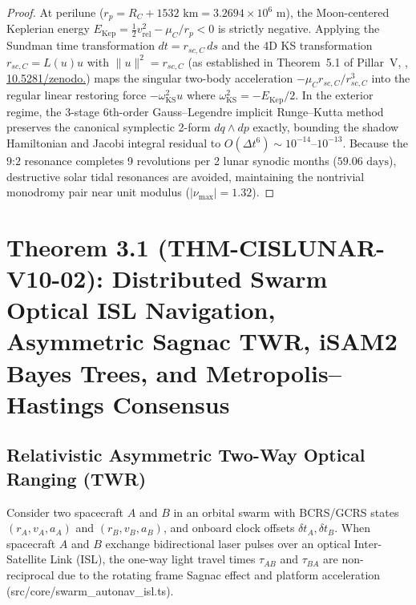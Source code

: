 \documentclass[11pt,a4paper,reqno]{article}
\def\bm#1{#1}%
\def\texttt#1{#1}%
\def\mathcal#1{#1}%
\def\mathbb#1{#1}%
\newcommand{\zenodo}[1]{\href{https://doi.org/10.5281/zenodo.#1}{\texttt{10.5281/\allowbreak zenodo.\allowbreak #1}}}
\theoremstyle{plain}
\theoremstyle{definition}
\theoremstyle{remark}
\numberwithin{equation}{section}
\begin{document}
\begin{proof}
At perilune ($r_p = R_{\mathbb{C}} + 1532\text{ km} = 3.2694 \times 10^6\text{ m}$), the Moon-centered Keplerian energy $E_{\text{Kep}} = \frac{1}{2}v_{\text{rel}}^2 - \mu_{\mathbb{C}} / r_p < 0$ is strictly negative. Applying the Sundman time transformation $dt = r_{sc,\mathbb{C}}\,ds$ and the 4D KS transformation $\bm{r}_{sc,\mathbb{C}} = \bm{L}(\bm{u})\bm{u}$ with $\|\bm{u}\|^2 = r_{sc,\mathbb{C}}$ (as established in Theorem~5.1 of Pillar~V, \cite{UnmaniPillarV2026}, \zenodo{23226184}) maps the singular two-body acceleration $-\mu_{\mathbb{C}}\bm{r}_{sc,\mathbb{C}}/r_{sc,\mathbb{C}}^3$ into the regular linear restoring force $-\omega_{\text{KS}}^2 \bm{u}$ where $\omega_{\text{KS}}^2 = -E_{\text{Kep}}/2$. In the exterior regime, the 3-stage 6th-order Gauss--Legendre implicit Runge--Kutta method preserves the canonical symplectic 2-form $d\bm{q} \wedge d\bm{p}$ exactly, bounding the shadow Hamiltonian and Jacobi integral residual to $\mathcal{O}(\Delta t^6) \sim 10^{-14}$--$10^{-13}$. Because the $9\text{:}2$ resonance completes 9 revolutions per 2 lunar synodic months ($59.06\text{ days}$), destructive solar tidal resonances are avoided, maintaining the nontrivial monodromy pair near unit modulus ($|\nu_{\max}| = 1.32$).
\end{proof}

\section{\texorpdfstring{Theorem 3.1 (\texttt{THM-CISLUNAR-V10-02}): Distributed Swarm Optical ISL Navigation, Asymmetric Sagnac TWR, iSAM2 Bayes Trees, and Metropolis--Hastings Consensus}{Theorem 3.1 (THM-CISLUNAR-V10-02): Distributed Swarm Optical ISL Navigation, Asymmetric Sagnac TWR, iSAM2 Bayes Trees, and Metropolis-Hastings Consensus}}

\subsection{Relativistic Asymmetric Two-Way Optical Ranging (TWR)}
Consider two spacecraft $A$ and $B$ in an orbital swarm with BCRS/GCRS states $(\bm{r}_A, \bm{v}_A, \bm{a}_A)$ and $(\bm{r}_B, \bm{v}_B, \bm{a}_B)$, and onboard clock offsets $\delta t_A, \delta t_B$. When spacecraft $A$ and $B$ exchange bidirectional laser pulses over an optical Inter-Satellite Link (ISL), the one-way light travel times $\tau_{AB}$ and $\tau_{BA}$ are non-reciprocal due to the rotating frame Sagnac effect and platform acceleration (\texttt{src/core/swarm\_autonav\_isl.ts}).
\end{document}
